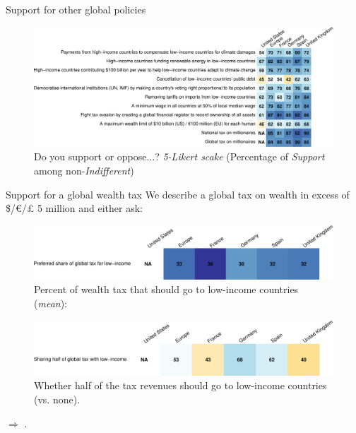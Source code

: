 \begin{framefont}{\small}
\begin{frame}{Support for other global policies\label{}}
	\vspace{-.3cm}
    \begin{figure}
        \centering 
        \caption{Do you support or oppose...? \textit{5-Likert scake} (Percentage of \textit{Support} among non-\textit{Indifferent})}
        \vspace{-.2cm}
        \includegraphics[width=\textwidth]{../figures/country_comparison/support_likert_share.pdf} 
    \end{figure}
\end{frame}

\begin{frame}{Support for a global wealth tax\label{}}
\bbvs \ip We describe a global tax on wealth in excess of \$/\euro{}/£ 5 million and either ask:\pause
\ee
\vspace{-.4cm}
\begin{figure}
    \centering 
    \caption{Percent of wealth tax that should go to low-income countries (\textit{mean}):}\vspace{-.2cm}%
    \includegraphics[height=.3\textheight]{../figures/country_comparison/global_tax_global_share_mean.pdf} 
\end{figure}\pause
    \begin{figure}
        \centering 
        \caption{Whether half of the tax revenues should go to low-income countries (vs. none).}\vspace{-.2cm}
        \includegraphics[height=.3\textheight]{../figures/country_comparison/global_tax_sharing_positive.pdf} 
    \end{figure}
$\Rightarrow$ .
\end{frame}


\end{framefont}

